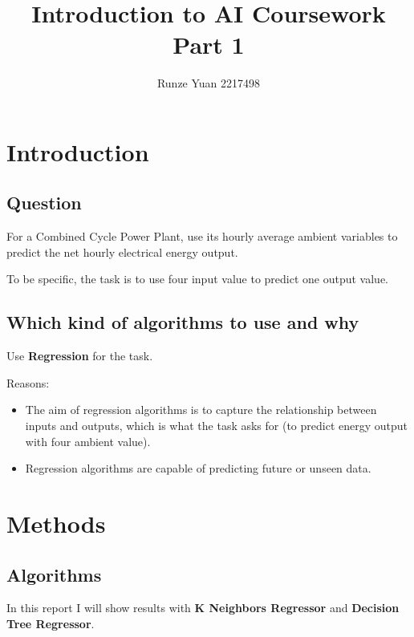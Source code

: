 \documentclass[a4paper]{article}
\title{Introduction to AI Coursework Part 1}
\author{Runze Yuan 2217498}
\begin{document}
\maketitle

\section{Introduction}

\subsection{Question}

For a Combined Cycle Power Plant, use its hourly average ambient variables to predict the net hourly electrical energy output.

To be specific, the task is to use four input value to predict one output value.

\subsection{Which kind of algorithms to use and why}

Use \textbf{Regression} for the task.

\vspace{5pt}

Reasons:
\begin{itemize}
    \item The aim of regression algorithms is to capture the relationship between inputs and outputs, which is what the task asks for (to predict energy output with four ambient value).
    \item Regression algorithms are capable of predicting future or unseen data.
\end{itemize}

\section{Methods}

\subsection{Algorithms}

In this report I will show results with \textbf{K Neighbors Regressor} and \textbf{Decision Tree Regressor}.
\end{document}
